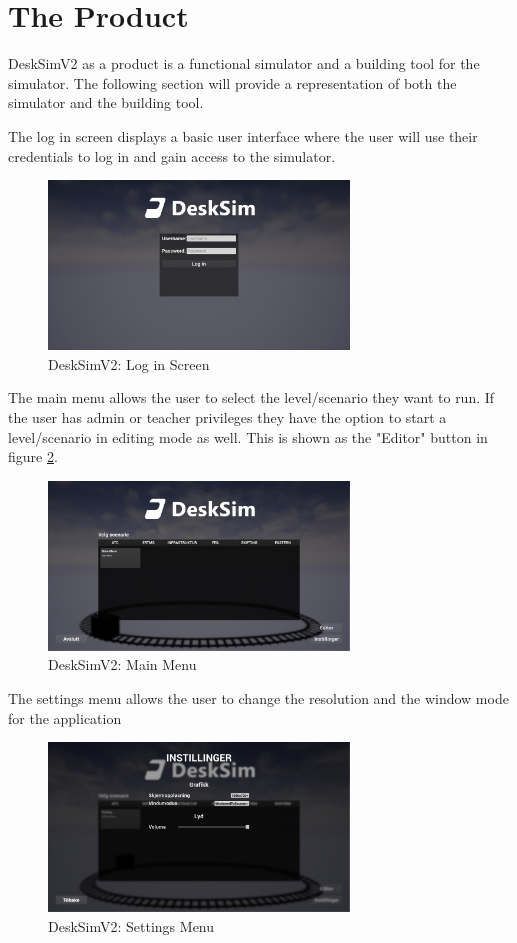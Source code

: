 \section{The Product}
DeskSimV2 as a product is a functional simulator and a building tool for the simulator. The following section will provide a representation of both the simulator and the building tool.

The log in screen displays a basic user interface where the user will use their credentials to log in and gain access to the simulator. \\
\bigskip
\begin{figure}[H]
    \centering
    \includegraphics[width=8cm]{figures/LogIn.PNG}
    \caption{DeskSimV2: Log in Screen}
    \label{Log_in_menu_img}
\end{figure} 
\bigskip \bigskip
The main menu allows the user to select the level/scenario they want to run.
If the user has admin or teacher privileges they have the option to start a level/scenario in editing mode as well. This is shown as the "Editor" button in figure \ref{Main_Menu_img}. \\
\bigskip
\begin{figure}[H]
    \centering
    \includegraphics[width=8cm]{figures/Main Menu.PNG}
    \vspace{12pt}
    \caption{DeskSimV2: Main Menu}
    \label{Main_Menu_img}
\end{figure} 
\bigskip \bigskip
The settings menu allows the user to change the resolution and the window mode for the application
\bigskip
\begin{figure}[H]
    \centering
    \vspace{12pt}
    \includegraphics[width=8cm]{figures/Settings.PNG}
    \caption{DeskSimV2: Settings Menu}
    \label{Settings_img}
\end{figure} 

